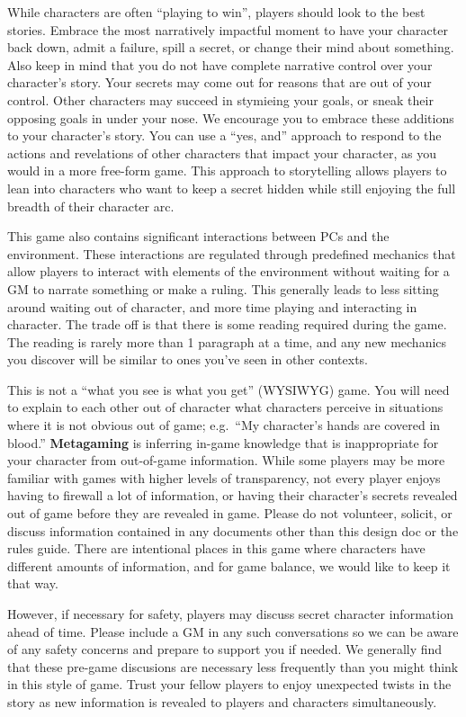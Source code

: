 \documentclass[sheet]{PP}
\begin{document}
While characters are often ``playing to win'', players should look to the best stories. Embrace the most narratively impactful moment to have your character back down, admit a failure, spill a secret, or change their mind about something. Also keep in mind that you do not have complete narrative control over your character's story. Your secrets may come out for reasons that are out of your control. Other characters may succeed in stymieing your goals, or sneak their opposing goals in under your nose. We encourage you to embrace these additions to your character's story. You can use a ``yes, and'' approach to respond to the actions and revelations of other characters that impact your character, as you would in a more free-form game. This approach to storytelling allows players to lean into characters who want to keep a secret hidden while still enjoying the full breadth of their character arc.

This game also contains significant interactions between PCs and the environment. These interactions are regulated through predefined mechanics that allow players to interact with elements of the environment without waiting for a GM to narrate something or make a ruling. This generally leads to less sitting around waiting out of character, and more time playing and interacting in character. The trade off is that there is some reading required during the game. The reading is rarely more than 1 paragraph at a time, and any new mechanics you discover will be similar to ones you've seen in other contexts.

This is not a ``what you see is what you get'' (WYSIWYG) game. You will need to explain to each other out of character what characters perceive in situations where it is not obvious out of game; e.g.\ ``My character's hands are covered in blood.'' {\bf Metagaming} is inferring in-game knowledge that is inappropriate for your character from out-of-game information. While some players may be more familiar with games with higher levels of transparency, not every player enjoys having to firewall a lot of information, or having their character's secrets revealed out of game before they are revealed in game. Please do not volunteer, solicit, or discuss information contained in any documents other than this design doc or the rules guide. There are intentional places in this game where characters have different amounts of information, and for game balance, we would like to keep it that way. 

However, if necessary for safety, players may discuss secret character information ahead of time. Please include a GM in any such conversations so we can be aware of any safety concerns and prepare to support you if needed. We generally find that these pre-game discusions are necessary less frequently than you might think in this style of game. Trust your fellow players to enjoy unexpected twists in the story as new information is revealed to players and characters simultaneously.
\end{document}
